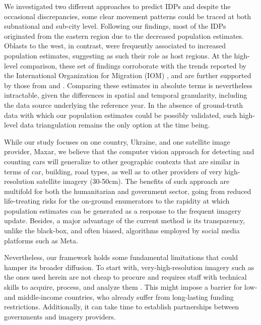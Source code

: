 \documentclass[sn-basic]{sn-jnl}%
\begin{document}
We investigated two different approaches to predict IDPs and despite the occasional discrepancies, some clear movement patterns could be traced at both subnational and sub-city level. Following our findings, most of the IDPs originated from the eastern region due to the decreased population estimates. Oblasts to the west, in contrast, were frequently associated to increased population estimates, suggesting as such their role as host regions. At the high-level comparison, these set of findings corroborate with the trends reported by the International Organization for Migration (IOM) \citep{IOM_2023}, and are further supported by those from 
\cite{Rowe_et_al_2022} and \cite{Leasure_et_al_2023}. Comparing these estimates in absolute terms is nevertheless intractable, given the differences in spatial and temporal granularity, including the data source underlying the reference year. In the absence of ground-truth data with which our population estimates could be possibly validated, such high-level data triangulation remains the only option at the time being.


While our study focuses on one country, Ukraine, and one satellite image provider, Maxar, we believe that the computer vision approach for detecting and counting cars will generalize to other geographic contexts that are similar in terms of car, building, road types, as well as to other providers of very high-resolution satellite imagery (30-50cm). The benefits of such approach are multifold for both the humanitarian and government sector, going from reduced life-treating risks for the on-ground enumerators to the rapidity at which population estimates can be generated as a response to the frequent imagery update. Besides, a major advantage of the current method is its transparency, unlike the black-box, and often biased, algorithms employed by social media platforms such as Meta.




Nevertheless, our framework holds some fundamental limitations that could hamper its broader diffusion. %
To start with, very-high-resolution imagery such as the ones used herein are not cheap to procure and requires staff with technical skills to acquire, process, and analyze them \citep{Quinn_et_al_2018}. This might impose a barrier for low- and middle-income countries, who already suffer from long-lasting funding restrictions. Additionally, it can take time to establish partnerships between governments and imagery providers. 
\end{document}
